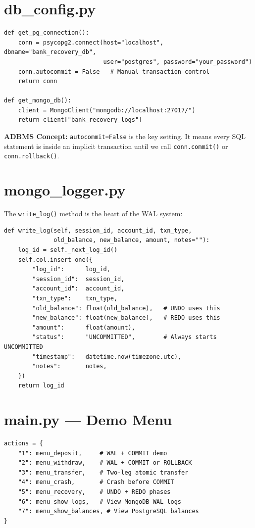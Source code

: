 \section{db\_config.py}

\begin{lstlisting}[style=pythonstyle, caption={db\_config.py --- connection functions}]
def get_pg_connection():
    conn = psycopg2.connect(host="localhost", dbname="bank_recovery_db",
                            user="postgres", password="your_password")
    conn.autocommit = False   # Manual transaction control
    return conn

def get_mongo_db():
    client = MongoClient("mongodb://localhost:27017/")
    return client["bank_recovery_logs"]
\end{lstlisting}

\textbf{ADBMS Concept:} \texttt{autocommit=False} is the key setting.
It means every SQL statement is inside an implicit transaction until we
call \texttt{conn.commit()} or \texttt{conn.rollback()}.

\section{mongo\_logger.py}

The \texttt{write\_log()} method is the heart of the WAL system:

\begin{lstlisting}[style=pythonstyle, caption={MongoLogger.write\_log() --- WAL insert}]
def write_log(self, session_id, account_id, txn_type,
              old_balance, new_balance, amount, notes=""):
    log_id = self._next_log_id()
    self.col.insert_one({
        "log_id":      log_id,
        "session_id":  session_id,
        "account_id":  account_id,
        "txn_type":    txn_type,
        "old_balance": float(old_balance),   # UNDO uses this
        "new_balance": float(new_balance),   # REDO uses this
        "amount":      float(amount),
        "status":      "UNCOMMITTED",        # Always starts UNCOMMITTED
        "timestamp":   datetime.now(timezone.utc),
        "notes":       notes,
    })
    return log_id
\end{lstlisting}

\section{main.py --- Demo Menu}

\begin{lstlisting}[style=pythonstyle, caption={main.py menu structure}]
actions = {
    "1": menu_deposit,     # WAL + COMMIT demo
    "2": menu_withdraw,    # WAL + COMMIT or ROLLBACK
    "3": menu_transfer,    # Two-leg atomic transfer
    "4": menu_crash,       # Crash before COMMIT
    "5": menu_recovery,    # UNDO + REDO phases
    "6": menu_show_logs,   # View MongoDB WAL logs
    "7": menu_show_balances, # View PostgreSQL balances
}
\end{lstlisting}
